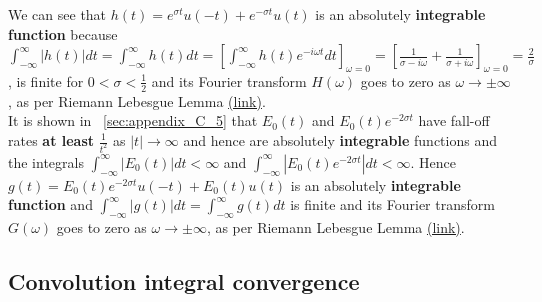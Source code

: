 \documentclass[11pt]{elsarticle}
\begin{document}
We can see that $h(t)=  e^{ \sigma t} u(-t) + e^{ - \sigma t} u(t) $ is an absolutely \textbf{integrable function} because $\int_{-\infty}^{\infty} |h(t)| dt = \int_{-\infty}^{\infty} h(t) dt =  [ \int_{-\infty}^{\infty} h(t) e^{-i \omega t} dt ]_{\omega=0} = [ \frac{1}{\sigma - i \omega} +  \frac{1}{\sigma + i \omega} ]_{\omega=0} = \frac{2}{\sigma}$, is finite for $0 < \sigma < \frac{1}{2}$ and its Fourier transform $ H(\omega)$ goes to zero as $\omega \to \pm \infty$, as per Riemann Lebesgue Lemma \href{https://en.wikipedia.org/wiki/Riemann-Lebesgue\_lemma}{(link)}.\\

It is shown in ~\ref{sec:appendix_C_5} that $E_0(t)$ and $E_0(t) e^{-2 \sigma t}$ have fall-off rates \textbf{at least} $\frac{1}{t^2}$ as $|t| \to \infty$ and hence are absolutely \textbf{integrable} functions and the integrals  $\int_{-\infty}^{\infty} |E_0(t)| dt < \infty$ and  $\int_{-\infty}^{\infty} |E_0(t) e^{-2 \sigma t}| dt < \infty$. Hence  $g(t) = E_0(t) e^{-2 \sigma t} u(-t) + E_0(t) u(t)$ is an  absolutely \textbf{integrable function} and $\int_{-\infty}^{\infty} |g(t)| dt = \int_{-\infty}^{\infty} g(t) dt$ is finite and its Fourier transform $ G(\omega)$ goes to zero as $\omega \to \pm \infty$, as per Riemann Lebesgue Lemma \href{https://en.wikipedia.org/wiki/Riemann-Lebesgue\_lemma}{(link)}.\\
 
 


\subsection{\label{sec:appendix_C_2} \textbf{ Convolution integral convergence  } \protect\\  \lowercase{} }
\end{document}
